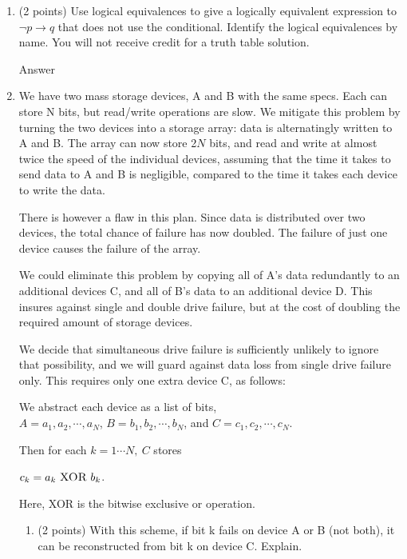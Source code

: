 \documentclass{article}
\begin{document}
\begin{enumerate}
    \item (2 points) Use logical equivalences to give a logically equivalent expression to $\neg p \rightarrow q$ that does not use the conditional. Identify the logical equivalences by name. You will not receive credit for a truth table solution.

    \color{blue}
        Answer
    \color{black}
    
    \item We have two mass storage devices, A and B with the same specs. Each can store N bits, but read/write operations are slow. We mitigate this problem by turning the two devices into a storage array: data is alternatingly written to A and B. The array can now store 2$N$ bits, and read and write at almost twice the speed of the individual devices, assuming that the time it takes to send data to A and B is negligible, compared to the time it takes each device to write the data.
    
    There is however a flaw in this plan. Since data is distributed over two devices, the total chance of failure has now doubled. The failure of just one device causes the failure of the array.

    We could eliminate this problem by copying all of A’s data redundantly to an additional devices C, and all of B’s data to an additional device D. This insures against single and double drive failure, but at the cost of doubling the required amount of storage devices.
    
    We decide that simultaneous drive failure is sufficiently unlikely to ignore that possibility, and we will guard against data loss from single drive failure only. This requires only one extra device C, as follows: 
    
    We abstract each device as a list of bits, 
    \\$A = a_1, a_2, \cdots, a_N$, $B = b_1, b_2, \cdots, b_N$, and $C = c_1, c_2, \cdots, c_N$.
    
    Then for each $k = 1\cdots N,\ C$ stores
    \begin{center}
        $c_k = a_k\ \textsc{XOR}\ b_k$. 
    \end{center}
    

    Here, XOR is the bitwise exclusive or operation.

    \begin{enumerate}
        \item  (2 points) With this scheme, if bit k fails on device A or B (not both), it can be reconstructed from bit k on device C. Explain.


\end{enumerate}
\end{enumerate}
\end{document}
